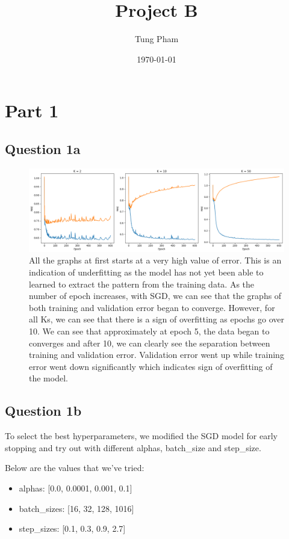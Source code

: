 \documentclass[a4paper]{article}
\title{Project B}
\author{Tung Pham}
\date{\today}
\begin{document}
\maketitle

\section{Part 1}
\subsection{Question 1a}
\begin{figure}[h]
	\includegraphics[width=\textwidth]{../images/Figure1a.png}
	\caption{All the graphs at first starts at a very high value of error. This is
  an indication of underfitting as the model has not yet been able to learned to
extract the pattern from the training data. As the number of epoch
increases, with SGD, we can see that the graphs of both training and validation
error began to converge. However, for all Ks, we can see that there is a sign of
overfitting as epochs go over 10. We can see that approximately at epoch 5, the
data began to converges and after 10, we can clearly see the separation between
training and validation error. Validation error went up while training error
went down significantly which indicates sign of overfitting of the model.}
\end{figure}
\subsection{Question 1b}
To select the best hyperparameters, we modified the SGD model for early stopping
and try out with different alphas, batch\_size and step\_size.

Below are the values that we've tried:
\begin{itemize}
  \item alphas: [0.0, 0.0001, 0.001, 0.1]
  \item batch\_sizes: [16, 32, 128, 1016]
  \item step\_sizes: [0.1, 0.3, 0.9, 2.7]
\end{itemize}
\end{document}
